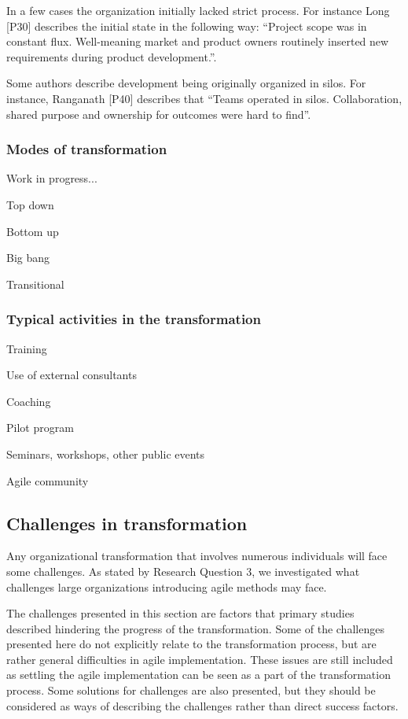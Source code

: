 \documentclass[preprint,authoryear,12pt]{elsarticle}
\begin{document}
In a few cases the organization initially lacked strict process. For instance
Long [P30] describes the initial state in the following way: ``Project scope was
in constant flux. Well-meaning market and product owners routinely inserted new
requirements during product development.''.

Some authors describe development being originally organized in silos. For
instance, Ranganath [P40] describes that ``Teams operated in silos.
Collaboration, shared purpose and ownership for outcomes were hard to find''.


\subsubsection{Modes of transformation}

Work in progress...

Top down

Bottom up

Big bang

Transitional


\subsubsection{Typical activities in the transformation}

Training

Use of external consultants

Coaching

Pilot program

Seminars, workshops, other public events

Agile community


\clearpage

\subsection{Challenges in transformation}

Any organizational transformation that involves numerous individuals will face
some challenges. As stated by Research Question 3, we investigated what
challenges large organizations introducing agile methods may face.

The challenges presented in this section are factors that primary studies
described hindering the progress of the transformation. Some of the challenges
presented here do not explicitly relate to the transformation process, but are
rather general difficulties in agile implementation. These issues are still
included as settling the agile implementation can be seen as a part of the
transformation process. Some solutions for challenges are also presented, but
they should be considered as ways of describing the challenges rather than
direct success factors.
\end{document}
